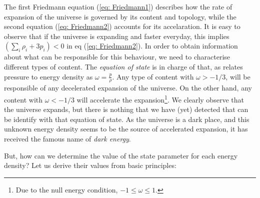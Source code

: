 \documentclass[11pt, a4paper]{article} %
\begin{document}
The first Friedmann equation (\ref{eq: Friedmann1}) describes how the rate of expansion of the universe is governed by its content and topology, while the second equation (\ref{eq: Friedmann2}) accounts for its accelaration. It is easy to observe that if the universe is expanding and faster everyday, this implies $\left(\sum_{i} \rho_{i} + 3 p_{i}\right) < 0$ in eq (\ref{eq: Friedmann2}). In order to obtain information about what can be responsible for this behaviour, we need to characterise different types of content. The \textit{equation of state} is in charge of that, as relates pressure to energy density as $\omega = \tfrac{p}{\rho}$. Any type of content with $\omega > - 1/3$, will be responsible of any decelerated expansion of the universe.  On the other hand, any content with $\omega < - 1/3$ will accelerate the expansion\footnote{Due to the null energy condition\cite{}, $-1\leq\omega\leq 1$. }. We clearly observe that the universe expands, but there is nothing that we have (yet) detected that can be identify with that equation of state. As the universe is a dark place, and this unknown energy density seems to be the source of accelerated expansion, it has received the famous name of \textit{dark energy}.

But, how can we determine the value of the state parameter for each energy density? Let us derive their values from basic principles:
\end{document}
